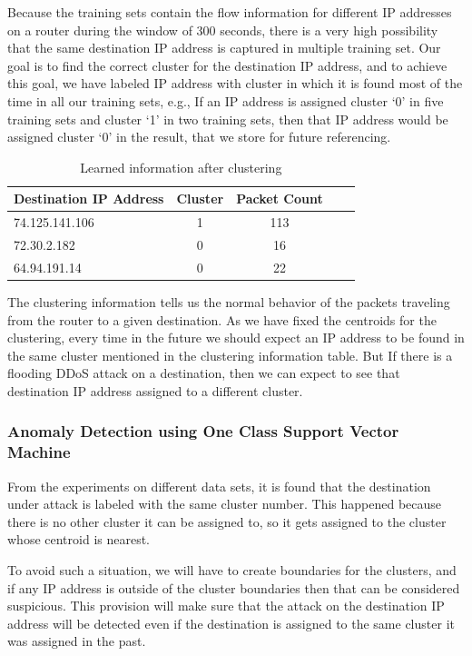 \documentclass[12pt,oneside,a4paper]{article}
\begin{document}
Because the training sets contain the flow information for different IP addresses on a router during the window of 300 seconds, there is a very high possibility that the same destination IP address is captured in multiple training set. Our goal is to find the correct cluster for the destination IP address, and to achieve this goal, we have labeled IP address with cluster in which it is found most of the time in all our training sets, e.g., If an IP address is assigned cluster `0' in five training sets and cluster `1' in two training sets, then that IP address would be assigned cluster `0' in the result, that we store for future referencing.

\begin{table}[H]
\centering
  \begin{tabular}{| l | c | c | c | c |}
    \hline
    {Destination IP Address}  &Cluster  &Packet Count \\
    \hline
    74.125.141.106  & 1     & 113  \\ \hline
    72.30.2.182     & 0     & 16   \\ \hline
    64.94.191.14    & 0     & 22   \\ \hline
  \end{tabular}
\caption{Learned information after clustering} \label{table:learned-clustering}
\end{table}

The clustering information tells us the normal behavior of the packets traveling from the router to a given destination. As we have fixed the centroids for the clustering, every time in the future we should expect an IP address to be found in the same cluster mentioned in the clustering information table. But If there is a flooding DDoS attack on a destination, then we can expect to see that destination IP address assigned to a different cluster.

\subsubsection{Anomaly Detection using One Class Support Vector Machine} \label{subsec:Anomaly_Detection}

From the experiments on different data sets, it is found that the destination under attack is labeled with the same cluster number. This happened because there is no other cluster it can be assigned to, so it gets assigned to the cluster whose centroid is nearest.

To avoid such a situation, we will have to create boundaries for the clusters, and if any IP address is outside of the cluster boundaries then that can be considered suspicious. This provision will make sure that the attack on the destination IP address will be detected even if the destination is assigned to the same cluster it was assigned in the past.
\end{document}
